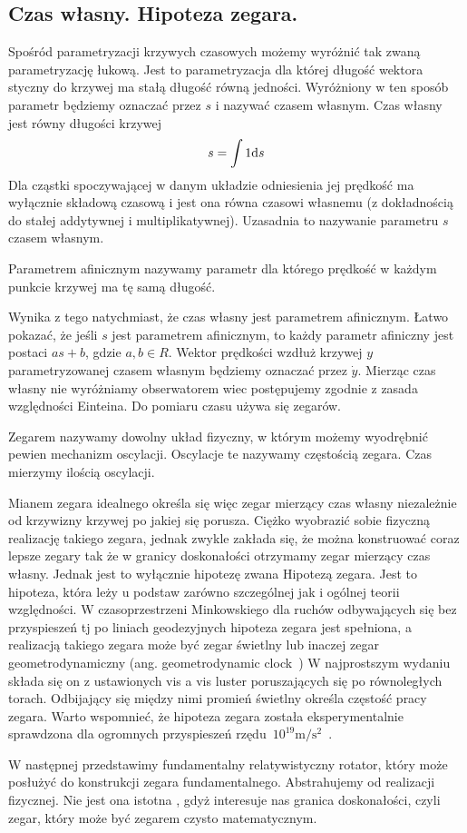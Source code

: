 \subsection{Czas własny. Hipoteza zegara.}
Spośród parametryzacji krzywych czasowych
 możemy wyróżnić tak zwaną parametryzację łukową.
Jest to parametryzacja dla której długość 
wektora styczny do krzywej ma stałą długość równą jedności.
Wyróżniony w ten sposób parametr będziemy oznaczać przez 
$s$ i nazywać czasem własnym.
Czas własny jest równy długości krzywej
\begin{align*}
s = \int 1 \text{d} s
\end{align*}
Dla cząstki spoczywającej w danym układzie odniesienia jej prędkość
ma wyłącznie składową czasową i jest 
ona równa czasowi własnemu (z dokładnością
do stałej addytywnej i multiplikatywnej). 
Uzasadnia to nazywanie parametru $s$ czasem własnym.
\begin{definition}
Parametrem afinicznym nazywamy parametr dla którego 
prędkość w każdym punkcie krzywej ma tę samą długość.
\end{definition}
Wynika z tego natychmiast, że czas własny jest parametrem afinicznym.
Łatwo pokazać, że jeśli $s$ jest 
parametrem afinicznym, to każdy parametr afiniczny 
jest postaci $a s+b$, gdzie $a,b\in R$.
Wektor prędkości wzdłuż krzywej $y$ parametryzowanej czasem 
własnym będziemy oznaczać przez $\dot{y}$.
Mierząc czas własny nie wyróżniamy obserwatorem wiec 
postępujemy zgodnie z zasada względności Einteina. 
Do pomiaru czasu używa się zegarów.
\begin{definition}
Zegarem nazywamy dowolny układ fizyczny, w którym możemy wyodrębnić pewien
mechanizm oscylacji. Oscylacje te nazywamy częstością zegara. Czas mierzymy
ilością oscylacji.
\end{definition}
Mianem zegara idealnego określa się więc zegar mierzący czas własny
niezależnie od krzywizny krzywej po jakiej się porusza.
Ciężko wyobrazić sobie fizyczną realizację takiego zegara, jednak
zwykle zakłada się, że można konstruować coraz lepsze zegary 
tak że w granicy doskonałości otrzymamy zegar mierzący czas własny. 
Jednak jest to wyłącznie hipotezę zwana Hipotezą zegara.
Jest to hipoteza, która leży u podstaw zarówno 
szczególnej jak i ogólnej teorii względności. 
W czasoprzestrzeni Minkowskiego dla 
ruchów odbywających się bez przyspieszeń 
tj po liniach geodezyjnych
hipoteza zegara jest spełniona, a 
realizacją takiego zegara może być zegar świetlny lub inaczej
zegar geometrodynamiczny (ang. geometrodynamic 
clock~\cite{ohanian2013gravitation})
W najprostszym wydaniu składa się on z ustawionych 
vis a vis luster poruszających się po równoległych torach.
Odbijający się między nimi promień świetlny 
określa częstość pracy zegara. 
Warto wspomnieć, że hipoteza zegara 
została eksperymentalnie sprawdzona dla ogromnych 
przyspieszeń rzędu~$10^{19}\si{\metre\per\second^2}$~\cite{Bailey1977}.

W następnej przedstawimy fundamentalny 
relatywistyczny rotator, który może posłużyć do konstrukcji zegara 
fundamentalnego. Abstrahujemy od realizacji fizycznej. 
Nie jest ona istotna , gdyż interesuje nas granica doskonałości, 
czyli zegar, który może być
zegarem czysto matematycznym.  




